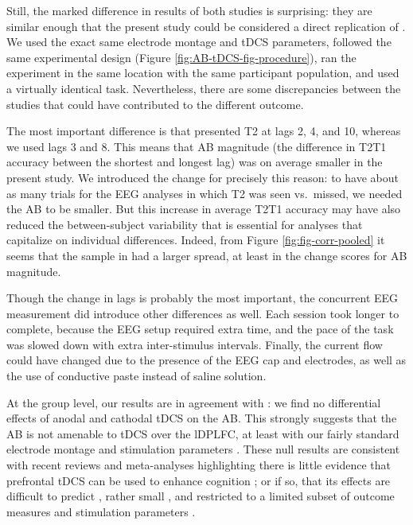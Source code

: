 \documentclass[11pt,english,]{memoir}
\begin{document}
Still, the marked difference in results of both studies is surprising: they are similar enough that the present study could be considered a direct replication \autocite{Zwaan2018} of \textcite{London2015}. We used the exact same electrode montage and tDCS parameters, followed the same experimental design (Figure \ref{fig:AB-tDCS-fig-procedure}), ran the experiment in the same location with the same participant population, and used a virtually identical task. Nevertheless, there are some discrepancies between the studies that could have contributed to the different outcome.

The most important difference is that \textcite{London2015} presented T2 at lags 2, 4, and 10, whereas we used lags 3 and 8. This means that AB magnitude (the difference in T2\textbar{}T1 accuracy between the shortest and longest lag) was on average smaller in the present study. We introduced the change for precisely this reason: to have about as many trials for the EEG analyses in which T2 was seen vs.~missed, we needed the AB to be smaller. But this increase in average T2\textbar{}T1 accuracy may have also reduced the between-subject variability that is essential for analyses that capitalize on individual differences. Indeed, from Figure \ref{fig:fig-corr-pooled} it seems that the sample in \textcite{London2015} had a larger spread, at least in the change scores for AB magnitude.

Though the change in lags is probably the most important, the concurrent EEG measurement did introduce other differences as well. Each session took longer to complete, because the EEG setup required extra time, and the pace of the task was slowed down with extra inter-stimulus intervals. Finally, the current flow could have changed due to the presence of the EEG cap and electrodes, as well as the use of conductive paste instead of saline solution.

At the group level, our results are in agreement with \textcite{London2015}: we find no differential effects of anodal and cathodal tDCS on the AB. This strongly suggests that the AB is not amenable to tDCS over the lDPLFC, at least with our fairly standard electrode montage and stimulation parameters \autocite{Santarnecchi2015}. These null results are consistent with recent reviews and meta-analyses highlighting there is little evidence that prefrontal tDCS can be used to enhance cognition \autocite{Medina2017}; or if so, that its effects are difficult to predict \autocite{Tremblay2014a}, rather small \autocite{Dedoncker2016a}, and restricted to a limited subset of outcome measures and stimulation parameters \autocite{Imburgio2018}.
\end{document}
